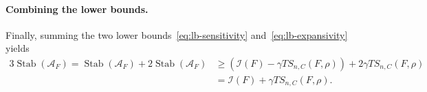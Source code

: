 \documentclass[twoside,11pt]{article}
\makeatletter
\newcommand{\R}{\mathbb{R}}
\let\save@mathaccent\mathaccent
\newcommand*\if@single[3]{%
  \setbox0\hbox{${\mathaccent"0362{#1}}^H$}%
  \setbox2\hbox{${\mathaccent"0362{\kern0pt#1}}^H$}%
  \ifdim\ht0=\ht2 #3\else #2\fi
  }
\newcommand*\rel@kern[1]{\kern#1\dimexpr\macc@kerna}
\newcommand*\widebar[1]{\@ifnextchar^{{\wide@bar{#1}{0}}}{\wide@bar{#1}{1}}}
\newcommand*\wide@bar[2]{\if@single{#1}{\wide@bar@{#1}{#2}{1}}{\wide@bar@{#1}{#2}{2}}}
\newcommand*\wide@bar@[3]{%
  \begingroup
  \def\mathaccent##1##2{%
    \let\mathaccent\save@mathaccent
    \if#32 \let\macc@nucleus\first@char \fi
    \setbox\z@\hbox{$\macc@style{\macc@nucleus}_{}$}%
    \setbox\tw@\hbox{$\macc@style{\macc@nucleus}{}_{}$}%
    \dimen@\wd\tw@
    \advance\dimen@-\wd\z@
    \divide\dimen@ 3
    \@tempdima\wd\tw@
    \advance\@tempdima-\scriptspace
    \divide\@tempdima 10
    \advance\dimen@-\@tempdima
    \ifdim\dimen@>\z@ \dimen@0pt\fi
    \rel@kern{0.6}\kern-\dimen@
    \if#31
      \overline{\rel@kern{-0.6}\kern\dimen@\macc@nucleus\rel@kern{0.4}\kern\dimen@}%
      \advance\dimen@0.4\dimexpr\macc@kerna
      \let\final@kern#2%
      \ifdim\dimen@<\z@ \let\final@kern1\fi
      \if\final@kern1 \kern-\dimen@\fi
    \else
      \overline{\rel@kern{-0.6}\kern\dimen@#1}%
    \fi
  }%
  \macc@depth\@ne
  \let\math@bgroup\@empty \let\math@egroup\macc@set@skewchar
  \mathsurround\z@ \frozen@everymath{\mathgroup\macc@group\relax}%
  \macc@set@skewchar\relax
  \let\mathaccentV\macc@nested@a
  \if#31
    \macc@nested@a\relax111{#1}%
  \else
    \def\gobble@till@marker##1\endmarker{}%
    \futurelet\first@char\gobble@till@marker#1\endmarker
    \ifcat\noexpand\first@char A\else
      \def\first@char{}%
    \fi
    \macc@nested@a\relax111{\first@char}%
  \fi
  \endgroup
}
\makeatother
\begin{document}
    \paragraph{Combining the lower bounds.}
    Finally, summing the two lower bounds~\eqref{eq:lb-sensitivity} and~\eqref{eq:lb-expansivity} yields
    \begin{align*}
        3 \operatorname{Stab}(\mathcal{A}_F) 
        = \operatorname{Stab}(\mathcal{A}_F) + 2\operatorname{Stab}(\mathcal{A}_F)
        & \geq (\mathcal{I}(F) - \gamma T S_{n,C}(F, \rho)) + 2 \gamma T S_{n,C}(F, \rho) \\
        & = \mathcal{I}(F) + \gamma T S_{n,C}(F, \rho). 
        \tag*{\BlackBox}
    \end{align*}
\end{document}
